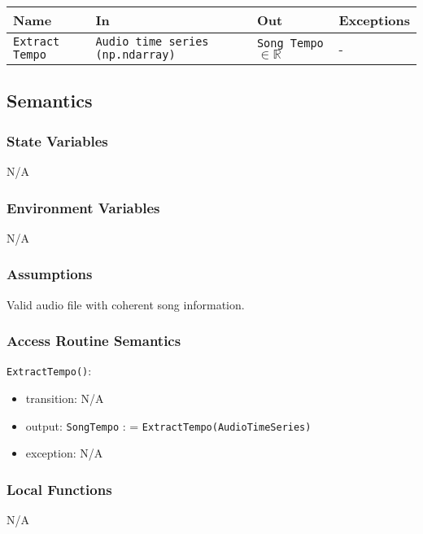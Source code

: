 \documentclass[12pt, titlepage]{article}
\begin{document}
\begin{center}
\begin{tabular}{p{2cm} p{4cm} p{4cm} p{2cm}}
\hline
\textbf{Name} & \textbf{In} & \textbf{Out} & \textbf{Exceptions}\\
\hline%
\texttt{Extract Tempo} &\texttt{Audio time series (np.ndarray)} &\texttt{Song Tempo} $\in \mathbb{R}$ &- \\
\hline
\end{tabular}
\end{center}

\subsection{Semantics}

\subsubsection{State Variables}
N/A

\subsubsection{Environment Variables}
N/A

\subsubsection{Assumptions}
Valid audio file with coherent song information.

\subsubsection{Access Routine Semantics}

\noindent \texttt{ExtractTempo()}:
\begin{itemize}
\item transition: N/A
\item output: \texttt{Song\textunderscore Tempo} : = \texttt{ExtractTempo(Audio\textunderscore Time\textunderscore Series)}
\item exception: N/A
\end{itemize}

\subsubsection{Local Functions}
N/A
\end{document}
